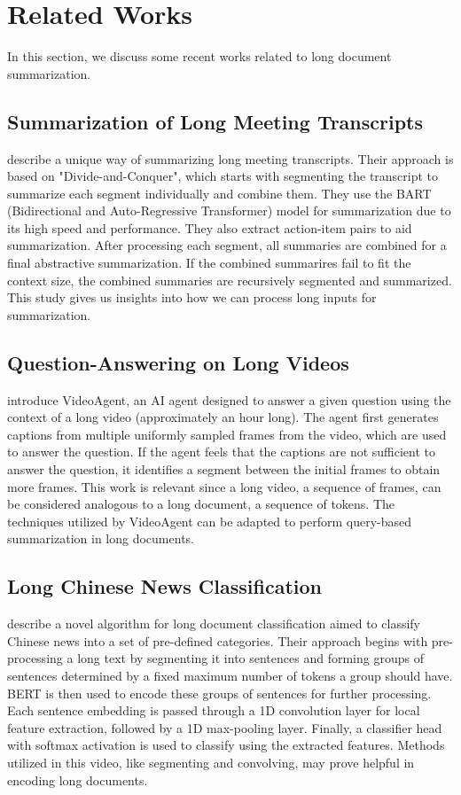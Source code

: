 \section{Related Works}

In this section, we discuss some recent works related to long document summarization.


\subsection*{Summarization of Long Meeting Transcripts}

\citet{10.1145/3639233.3639253} describe a unique way of summarizing long meeting
transcripts.
Their approach is based on "Divide-and-Conquer", which starts with
segmenting the transcript to summarize each segment individually and combine them.
They use the BART (Bidirectional and Auto-Regressive Transformer) model for
summarization due to its high speed and performance.
They also extract action-item pairs to aid summarization.
After processing each segment, all summaries are combined for a final abstractive
summarization.
If the combined summarires fail to fit the context size, the combined summaries are
recursively segmented and summarized.
This study gives us insights into how we can process long inputs for summarization.


\subsection*{Question-Answering on Long Videos}

\citet{wang2024videoagent} introduce VideoAgent, an AI agent designed to answer a
given question using the context of a long video (approximately an hour long).
The agent first generates captions from multiple uniformly sampled frames from the
video, which are used to answer the question.
If the agent feels that the captions are not sufficient to answer the question, it
identifies a segment between the initial frames to obtain more frames.
This work is relevant since a long video, a sequence of frames, can be considered
analogous to a long document, a sequence of tokens. The techniques utilized by
VideoAgent can be adapted to perform query-based summarization in long documents.


\subsection*{Long Chinese News Classification}

\citet{chen2022long} describe a novel algorithm for long document classification
aimed to classify Chinese news into a set of pre-defined categories.
Their approach begins with pre-processing a long text by segmenting it into sentences
and forming groups of sentences determined by a fixed maximum number of tokens a
group should have.
BERT is then used to encode these groups of sentences for further processing.
Each sentence embedding is passed through a 1D convolution layer for local feature
extraction, followed by a 1D max-pooling layer.
Finally, a classifier head with softmax activation is used to classify using the
extracted features.
Methods utilized in this video, like segmenting and convolving, may prove helpful in
encoding long documents.
